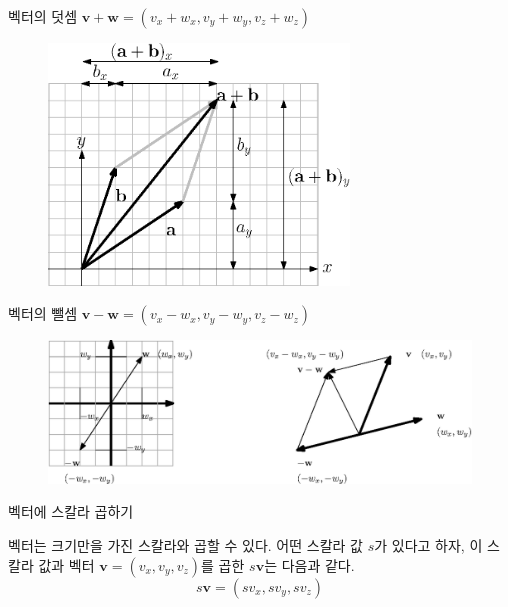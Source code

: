 \begin{frame}{벡터의 덧셈}
$\mathbf v + \mathbf w = (v_x + w_x, v_y + w_y , v_z + w_z )$
\begin{figure}
\includegraphics[width=8cm]{Math_vector/vectorAdd.eps}
\end{figure}
\end{frame}

\begin{frame}{벡터의 뺄셈}
$\mathbf v - \mathbf w = (v_x - w_x, v_y - w_y , v_z - w_z )$
\\

\begin{figure}
\includegraphics[width=12cm]{Math_vector/vectorSub.eps}
\end{figure}
\end{frame}

\begin{frame}{벡터에 스칼라 곱하기}

벡터는 크기만을 가진 스칼라와 곱할 수 있다. 어떤 스칼라 값 $s$가 있다고 하자, 이 스칼라 값과 벡터 $\mathbf v = (v_x , v_y, v_z)$를 곱한 $s \mathbf v$는 다음과 같다.
$$ s \mathbf v = (s v_x , s v_y , s v_z )$$
\end{frame}

